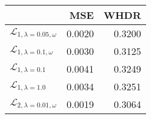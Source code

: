\begin{tabular}{lrr}
\toprule
{} &     MSE &    WHDR \\
\midrule
$\mathcal L_{1,\lambda=0.05,\omega}$ &  0.0020 &  0.3200 \\
$\mathcal L_{1,\lambda=0.1,\omega}$  &  0.0030 &  0.3125 \\
$\mathcal L_{1,\lambda=0.1}$         &  0.0041 &  0.3249 \\
$\mathcal L_{1,\lambda=1.0}$         &  0.0034 &  0.3251 \\
$\mathcal L_{2,\lambda=0.01,\omega}$ &  0.0019 &  0.3064 \\
\bottomrule
\end{tabular}

